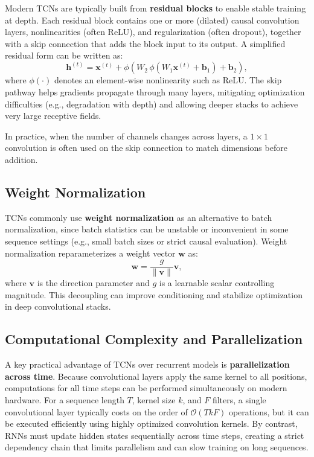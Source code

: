 \documentclass{article}
\begin{document}
Modern TCNs are typically built from \textbf{residual blocks} to enable stable training at depth. Each residual block contains one or more (dilated) causal convolution layers, nonlinearities (often ReLU), and regularization (often dropout), together with a skip connection that adds the block input to its output. A simplified residual form can be written as:
\[
\mathbf{h}^{(t)} = \mathbf{x}^{(t)} + \phi\!\left(W_2 \, \phi\!\left(W_1 \mathbf{x}^{(t)} + \mathbf{b}_1\right) + \mathbf{b}_2\right),
\]
where $\phi(\cdot)$ denotes an element-wise nonlinearity such as ReLU. The skip pathway helps gradients propagate through many layers, mitigating optimization difficulties (e.g., degradation with depth) and allowing deeper stacks to achieve very large receptive fields.

In practice, when the number of channels changes across layers, a $1 \times 1$ convolution is often used on the skip connection to match dimensions before addition.

\subsection{Weight Normalization}

TCNs commonly use \textbf{weight normalization} as an alternative to batch normalization, since batch statistics can be unstable or inconvenient in some sequence settings (e.g., small batch sizes or strict causal evaluation). Weight normalization reparameterizes a weight vector $\mathbf{w}$ as:
\[
\mathbf{w} = \frac{g}{\|\mathbf{v}\|}\mathbf{v},
\]
where $\mathbf{v}$ is the direction parameter and $g$ is a learnable scalar controlling magnitude. This decoupling can improve conditioning and stabilize optimization in deep convolutional stacks.

\subsection{Computational Complexity and Parallelization}

A key practical advantage of TCNs over recurrent models is \textbf{parallelization across time}. Because convolutional layers apply the same kernel to all positions, computations for all time steps can be performed simultaneously on modern hardware. For a sequence length $T$, kernel size $k$, and $F$ filters, a single convolutional layer typically costs on the order of $\mathcal{O}(T k F)$ operations, but it can be executed efficiently using highly optimized convolution kernels. By contrast, RNNs must update hidden states sequentially across time steps, creating a strict dependency chain that limits parallelism and can slow training on long sequences.
\end{document}
